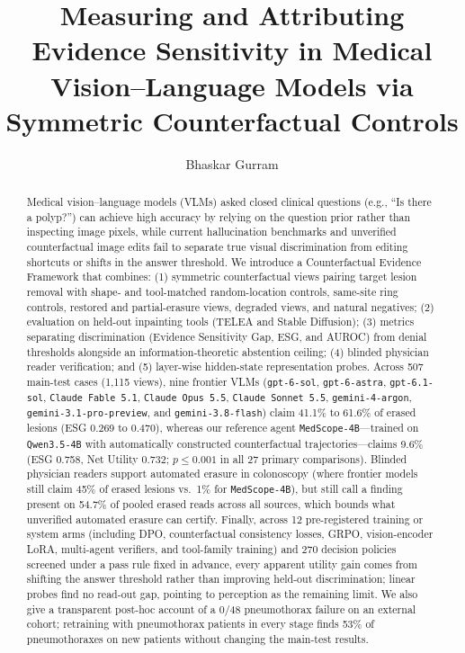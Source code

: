 \documentclass[5p,times,twocolumn,authoryear]{elsarticle}
\begin{document}
\begin{frontmatter}
\title{Measuring and Attributing Evidence Sensitivity in Medical Vision--Language Models via Symmetric Counterfactual Controls}
\author{Bhaskar Gurram}

\begin{abstract}
Medical vision--language models (VLMs) asked closed clinical questions (e.g., ``Is there a polyp?'') can achieve high accuracy by relying on the question prior rather than inspecting image pixels, while current hallucination benchmarks and unverified counterfactual image edits fail to separate true visual discrimination from editing shortcuts or shifts in the answer threshold. We introduce a Counterfactual Evidence Framework that combines: (1) symmetric counterfactual views pairing target lesion removal with shape- and tool-matched random-location controls, same-site ring controls, restored and partial-erasure views, degraded views, and natural negatives; (2) evaluation on held-out inpainting tools (TELEA and Stable Diffusion); (3) metrics separating discrimination (Evidence Sensitivity Gap, ESG, and AUROC) from denial thresholds alongside an information-theoretic abstention ceiling; (4) blinded physician reader verification; and (5) layer-wise hidden-state representation probes. Across 507 main-test cases (1,115 views), nine frontier VLMs (\texttt{gpt-6-sol}, \texttt{gpt-6-astra}, \texttt{gpt-6.1-sol}, \texttt{Claude Fable 5.1}, \texttt{Claude Opus 5.5}, \texttt{Claude Sonnet 5.5}, \texttt{gemini-4-argon}, \texttt{gemini-3.1-pro-preview}, and \texttt{gemini-3.8-flash}) claim 41.1\% to 61.6\% of erased lesions (ESG 0.269 to 0.470), whereas our reference agent \texttt{MedScope-4B}---trained on \texttt{Qwen3.5-4B} with automatically constructed counterfactual trajectories---claims 9.6\% (ESG 0.758, Net Utility 0.732; $p \le 0.001$ in all 27 primary comparisons). Blinded physician readers support automated erasure in colonoscopy (where frontier models still claim 45\% of erased lesions vs.\ 1\% for \texttt{MedScope-4B}), but still call a finding present on 54.7\% of pooled erased reads across all sources, which bounds what unverified automated erasure can certify. Finally, across 12 pre-registered training or system arms (including DPO, counterfactual consistency losses, GRPO, vision-encoder LoRA, multi-agent verifiers, and tool-family training) and 270 decision policies screened under a pass rule fixed in advance, every apparent utility gain comes from shifting the answer threshold rather than improving held-out discrimination; linear probes find no read-out gap, pointing to perception as the remaining limit. We also give a transparent post-hoc account of a 0/48 pneumothorax failure on an external cohort; retraining with pneumothorax patients in every stage finds 53\% of pneumothoraxes on new patients without changing the main-test results.
\end{abstract}


\end{frontmatter}
\end{document}
